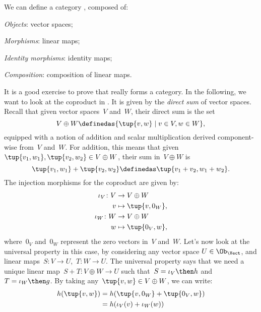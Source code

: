 \begin{example}
  We can define a category \iindex{\Vect}, composed of:
  \begin{compactitem}
    \item \emph{Objects}: vector spaces;
    \item \emph{Morphisms}: linear maps;
    \item \emph{Identity morphisms}: identity maps;
    \item \emph{Composition}: composition of linear maps.
  \end{compactitem}
  It is a good exercise to prove that \Vect really forms a category. In the following, we want to look at the coproduct in \Vect. It is given by the \emph{direct sum} of vector spaces. Recall that given vector spaces~$V$ and~$W$, their direct sum is the set
  \begin{equation*}
    V\oplus W\definedas \{\tup{v,w}\mid v\in V,w\in W\},
  \end{equation*}
  equipped with a notion of addition and scalar multiplication derived component-wise from~$V$ and~$W$. For addition, this means that given~$\tup{v_1,w_1},\tup{v_2,w_2}\in V\oplus W$, their sum in~$V \oplus W$ is
  \begin{equation*}
    \tup{v_1,w_1}+\tup{v_2,w_2}\definedas \tup{v_1+v_2,w_1+w_2}.
  \end{equation*}
  The injection morphisms for the coproduct are given by:
  \begin{equation*}
    \begin{aligned}
      \iota_V \colon V&\to V\oplus W\\
      v&\mapsto \tup{v,0_W},\\
      \iota_W \colon W&\to V\oplus W\\
      w&\mapsto \tup{0_V,w},
    \end{aligned}
  \end{equation*}
  where~$0_V$ and~$0_W$ represent the zero vectors in~$V$ and~$W$. Let's now look at the universal property in this case, by considering any vector space $U\in \Ob_\Vect$, and linear maps~$S\colon V\to U$,~$T\colon W\to U$. The universal property says that we need a unique linear map~$S+T\colon V\oplus W \to U$ such that~$S=\iota_V\then h$ and~$T=\iota_W\then g$. By taking any~$\tup{v,w}\in V\oplus W$, we can write:
  \begin{equation*}
    \begin{aligned}
      h(\tup{v,w})&=h(\tup{v,0_W}+\tup{0_V,w})\\
      &=h(\iota_V(v)+\iota_W(w)) \\

\end{aligned}
\end{equation*}
\end{example}
